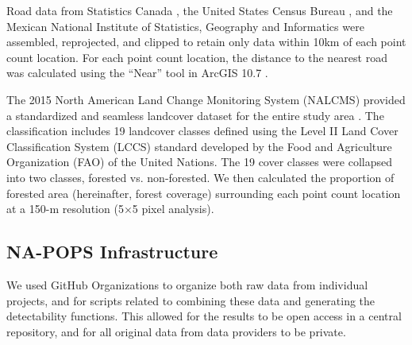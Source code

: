 \par Road data from Statistics Canada \citep{statistics_canada_intercensal_2019}, the United States Census Bureau \citep{us_geological_survey_usgs_2020}, and the Mexican National Institute of Statistics, Geography and Informatics \citep{national_institute_of_statistics_geography_and_informatics_communication_2019} were assembled, reprojected, and clipped to retain only data within 10km of each point count location. For each point count location, the distance to the nearest road was calculated using the “Near” tool in ArcGIS 10.7 \citep{environmental_systems_research_institute_arcgis_2011}. 

\par The 2015 North American Land Change Monitoring System (NALCMS) provided a standardized and seamless landcover dataset for the entire study area \citep{natural_resources_canada_2010-2015_2020}. The classification includes 19 landcover classes defined using the Level II Land Cover Classification System (LCCS) standard developed by the Food and Agriculture Organization (FAO) of the United Nations. The 19 cover classes were collapsed into two classes, forested vs. non-forested. We then calculated the proportion of forested area (hereinafter, forest coverage) surrounding each point count location at a 150-m resolution (5×5 pixel analysis).

\subsection{NA-POPS Infrastructure}
\par We used GitHub Organizations \citep{braga_not_2023} to organize both raw data from individual projects, and for scripts related to combining these data and generating the detectability functions. This allowed for the results to be open access in a central repository, and for all original data from data providers to be private.

